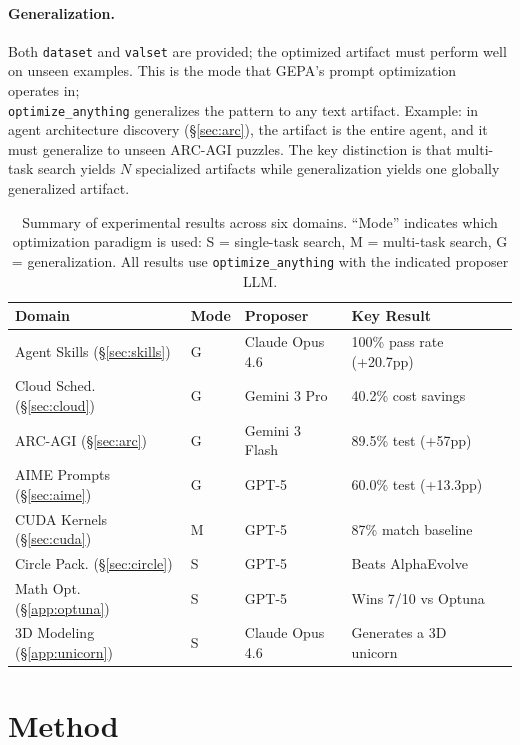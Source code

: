 \documentclass[sigconf]{acmart}
\newcommand{\oa}{\texttt{optimize\_anything}}
\begin{document}
\paragraph{Generalization.} Both \texttt{dataset} and \texttt{valset} are provided; the optimized artifact must perform well on unseen examples. This is the mode that GEPA's prompt optimization~\cite{agrawal2026gepa} operates in;\\ \oa{} generalizes the pattern to any text artifact. Example: in agent architecture discovery (\S\ref{sec:arc}), the artifact is the entire agent, and it must generalize to unseen ARC-AGI puzzles. The key distinction is that multi-task search yields $N$ specialized artifacts while generalization yields one globally generalized artifact.

\begin{table}[t]
\caption{Summary of experimental results across six domains. ``Mode'' indicates which optimization paradigm is used: S = single-task search, M = multi-task search, G = generalization. All results use \oa{} with the indicated proposer LLM.}
\label{tab:summary}
\small
\begin{tabular}{@{}llllr@{}}
\toprule
\textbf{Domain} & \textbf{Mode} & \textbf{Proposer} & \textbf{Key Result} \\
\midrule
Agent Skills (\S\ref{sec:skills}) & G & Claude Opus 4.6 & 100\% pass rate (+20.7pp) \\
Cloud Sched. (\S\ref{sec:cloud}) & G & Gemini 3 Pro & 40.2\% cost savings \\
ARC-AGI (\S\ref{sec:arc}) & G & Gemini 3 Flash & 89.5\% test (+57pp) \\
AIME Prompts (\S\ref{sec:aime}) & G & GPT-5 & 60.0\% test (+13.3pp) \\
CUDA Kernels (\S\ref{sec:cuda}) & M & GPT-5 & 87\% match baseline \\
Circle Pack. (\S\ref{sec:circle}) & S & GPT-5 & Beats AlphaEvolve \\
Math Opt. (\S\ref{app:optuna}) & S & GPT-5 & Wins 7/10 vs Optuna \\
3D Modeling (\S\ref{app:unicorn}) & S & Claude Opus 4.6 & Generates a 3D unicorn \\
\bottomrule
\end{tabular}
\end{table}


\section{Method}\label{sec:method}
\end{document}
